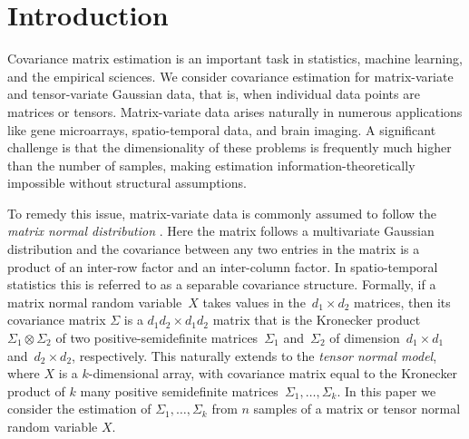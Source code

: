 \documentclass[aos]{imsart}
\theoremstyle{definition}
\newcommand{\ot}{\otimes}
\begin{document}
\section{Introduction}
Covariance matrix estimation is an important task in statistics, machine learning, and the empirical sciences.
We consider covariance estimation for matrix-variate and tensor-variate Gaussian data, that is, when individual data points are matrices or tensors. Matrix-variate data arises naturally in numerous applications like gene microarrays, spatio-temporal data, and brain imaging.
A significant challenge is that the dimensionality of these problems is frequently much higher than the number of samples, making estimation information-theoretically impossible without structural assumptions.

To remedy this issue, matrix-variate data is commonly assumed to follow the \emph{matrix normal distribution} \citep{dutilleul1999mle,werner2008estimation}.
Here the matrix follows a multivariate Gaussian distribution and the covariance between any two entries in the matrix is a product of an inter-row factor and an inter-column factor.
In spatio-temporal statistics this is referred to as a separable covariance structure.
Formally, if a matrix normal random variable~$X$ takes values in the~$d_1\times d_2$ matrices, then its covariance matrix $\Sigma$ is a $d_1d_2\times d_1 d_2$ matrix that is the Kronecker product~$\Sigma_1 \ot \Sigma_2$ of two positive-semidefinite matrices~$\Sigma_1$ and~$\Sigma_2$ of dimension~$d_1\times d_1$ and~$d_2\times d_2$, respectively.
This naturally extends to the \emph{tensor normal model}, where $X$ is a $k$-dimensional array, with covariance matrix equal to the Kronecker product of $k$ many positive semidefinite matrices~$\Sigma_1, \dots, \Sigma_k$.
In this paper we consider the estimation of $\Sigma_1, \dots, \Sigma_k$ from $n$ samples of a matrix or tensor normal random variable $X$.
\end{document}
